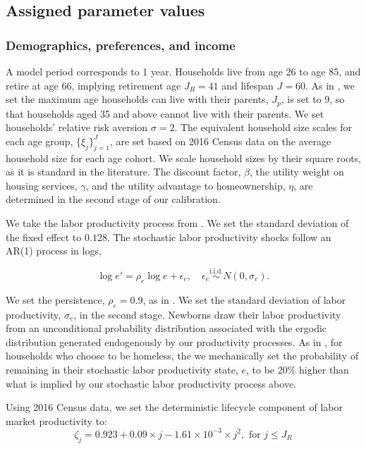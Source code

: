 \documentclass[parskip=full]{article}
\begin{document}
\subsection{Assigned parameter values}

\subsubsection{Demographics, preferences, and income}
A model period corresponds to 1 year. Households live from age 26 to age 85, and retire at age 66, implying retirement age $J_{R}=41$ and lifespan $J=60$. As in \citet{rs-2023}, we set the maximum age households can live with their parents, $J_{p}$, is set to 9, so that households aged 35 and above cannot live with their parents. We set households' relative risk aversion $\sigma=2$. The equivalent household size scales for each age group, $\{\xi_{j}\}_{j=1}^{J}$, are set based on 2016 Census data on the average household size for each age cohort. We scale household sizes by their square roots, as it is standard in the literature. The discount factor, $\beta$, the utility weight on housing services, $\gamma$, and the utility advantage to homeownership, $\eta$, are determined in the second stage of our calibration.

We take the labor productivity process from \citet{gkkoc}. We set the standard deviation of the fixed effect to $0.128$. The stochastic labor productivity shocks follow an AR(1) process in logs,

\begin{equation*}
  \log e' = \rho_{e} \log e + \epsilon_{e},\quad \epsilon_{e}\overset{\mathrm{i.i.d.}} \sim N(0,\sigma_{e}).
\end{equation*}

\noindent We set the persistence, $\rho_{e}=0.9$, as in \citet{gkkoc}. We set the standard deviation of labor productivity, $\sigma_{e}$, in the second stage. Newborns draw their labor productivity from an unconditional probability distribution associated with the ergodic distribution generated endogenously by our productivity processes. As in \citet{az-2024}, for households who choose to be homeless, the we mechanically set the probability of remaining in their stochastic labor productivity state, $e$, to be 20\% higher than what is implied by our stochastic labor productivity process above.

Using 2016 Census data, we set the deterministic lifecycle component of labor market productivity to: 
\begin{equation*}
\zeta_j = 0.923+0.09\times j-1.61\times 10^{-3}\times j^{2}, \mbox{ for } j\leq J_{R}
\end{equation*}
\end{document}
